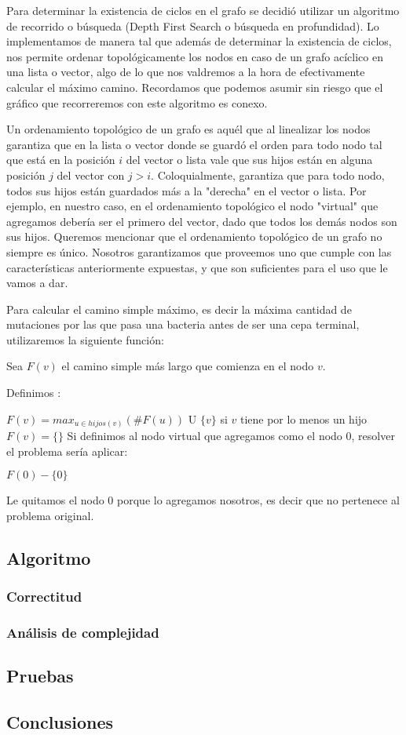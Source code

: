 \quad Para determinar la existencia de ciclos en el grafo se decidió utilizar un algoritmo de recorrido o búsqueda  (Depth First Search o búsqueda en profundidad). Lo implementamos de manera tal que además de determinar la existencia de ciclos, nos permite ordenar topológicamente los nodos en caso de un grafo acíclico en una lista o vector, algo de lo que nos valdremos a la hora de efectivamente calcular el máximo camino. Recordamos que podemos asumir sin riesgo que el gráfico que recorreremos con este algoritmo es conexo.

\quad Un ordenamiento topológico de un grafo es aquél que al linealizar los nodos garantiza que en la lista o vector donde se guardó el orden para todo nodo tal que está en la posición $i$ del vector o lista vale que sus hijos están en alguna posición $j$ del vector con $j>i$. Coloquialmente, garantiza que para todo nodo, todos sus hijos están guardados más a la "derecha" en el vector o lista. Por ejemplo, en nuestro caso, en el ordenamiento topológico el nodo "virtual" que agregamos debería ser el primero del vector, dado que todos los demás nodos son sus hijos. Queremos mencionar que el ordenamiento topológico de un grafo no siempre es único. Nosotros garantizamos que proveemos uno que cumple con las características anteriormente expuestas, y que son suficientes para el uso que le vamos a dar.


\quad Para calcular el camino simple máximo, es decir la máxima cantidad de mutaciones por las que pasa una bacteria antes de ser una cepa terminal, utilizaremos la siguiente función:

\quad Sea $F(v)$ el camino simple más largo que comienza en el nodo $v$.

\quad Definimos :

\quad $F(v)= max_{u \in hijos(v)} (\#F(u))$ U $\{v\}$ si $v$ tiene por lo menos un hijo
\quad $F(v)=\{\}$
\quad Si definimos al nodo virtual que agregamos como el nodo 0, resolver el problema sería aplicar:

\quad $F(0) - \{0\}$

\quad Le quitamos el nodo 0 porque lo agregamos nosotros, es decir que no pertenece al problema original.





 

\subsection{Algoritmo}
 

\subsubsection{Correctitud} 



\subsubsection{An\'alisis de complejidad}
 
 

\subsection{Pruebas}



\subsection{Conclusiones}
